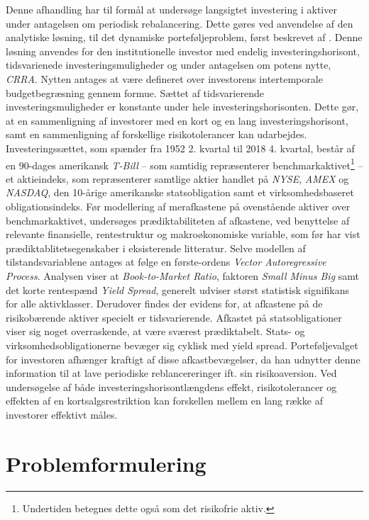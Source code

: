 \documentclass[
  a4paper,
  oneside]{memoir}
\begin{document}
Denne afhandling har til formål at undersøge langsigtet investering i aktiver under antagelsen om periodisk rebalancering. Dette gøres ved anvendelse af den analytiske løsning, til det dynamiske porteføljeproblem, først beskrevet af \citep{JurVic2011}. Denne løsning anvendes for den institutionelle investor med endelig investeringshorisont, tidsvarienede investeringsmuligheder og under antagelsen om potens nytte, \emph{CRRA}. Nytten antages at være defineret over investorens intertemporale budgetbegræsning gennem formue. Sættet af tidsvarierende investeringsmuligheder er konstante under hele investeringshorisonten. Dette gør, at en sammenligning af investorer med en kort og en lang investeringshorisont, samt en sammenligning af forskellige risikotolerancer kan udarbejdes. Investeringssættet, som spænder fra 1952 2. kvartal til 2018 4. kvartal, består af en 90-dages amerikansk \emph{T-Bill} -- som samtidig repræsenterer benchmarkaktivet\footnote{Undertiden betegnes dette også som det risikofrie aktiv.} -- et aktieindeks, som repræsenterer samtlige aktier handlet på \emph{NYSE}, \emph{AMEX} og \emph{NASDAQ}, den 10-årige amerikanske statsobligation samt et virksomhedsbaseret obligationsindeks. Før modellering af merafkastene på ovenstående aktiver over benchmarkaktivet, undersøges prædiktabiliteten af afkastene, ved benyttelse af relevante finansielle, rentestruktur og makroøkonomiske variable, som før har vist prædiktablitetsegenskaber i eksisterende litteratur. Selve modellen af tilstandsvariablene antages at følge en første-ordens \emph{Vector Autoregressive Process}. Analysen viser at \emph{Book-to-Market Ratio}, faktoren \emph{Small Minus Big} samt det korte rentespænd \emph{Yield Spread}, generelt udviser størst statistisk signifikans for alle aktivklasser. Derudover findes der evidens for, at afkastene på de risikobærende aktiver specielt er tidsvarierende. Afkastet på statsobligationer viser sig noget overraskende, at være sværest prædiktabelt. Stats- og virksomhedsobligationerne bevæger sig cyklisk med yield spread. Porteføljevalget for investoren afhænger kraftigt af disse afkastbevægelser, da han udnytter denne information til at lave periodiske reblancereringer ift. sin risikoaversion. Ved undersøgelse af både investeringshorisontlængdens effekt, risikotolerancer og effekten af en kortsalgsrestriktion kan forskellen mellem en lang række af investorer effektivt måles.

\hypertarget{problemformulering}{%
\section{Problemformulering}\label{problemformulering}}
\end{document}
